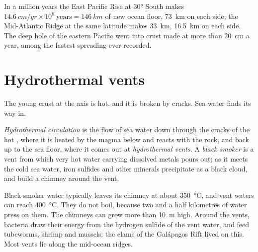 \begin{example}\label{ex:g11:ocean-ridges:rates}
In a million years the East Pacific Rise at \ang{30} South makes
$\qty{14.6}{cm/yr} \times 10^6\ \text{years} = \qty{146}{km}$ of new ocean
floor, \qty{73}{km} on each side; the Mid-Atlantic Ridge at the same latitude
makes \qty{33}{km}, \qty{16.5}{km} on each side. The deep hole of the eastern
Pacific went into crust made at more than \qty{20}{cm} a year, among the
fastest spreading ever recorded.
\end{example}

\section{Hydrothermal vents}

The young crust at the axis is hot, and it is broken by cracks. Sea water
finds its way in.

\begin{definition}\label{def:g11:ocean-ridges:hydrothermal}
\emph{Hydrothermal circulation} is the flow
of sea water down through the cracks of the hot , where it is
heated by the magma below and reacts with the rock, and back up to the sea
floor, where it comes out at \emph{hydrothermal vents}. A \emph{black
smoker} is a vent from which very hot water carrying
dissolved metals pours out; as it meets the cold sea water, iron sulfides and
other minerals precipitate as a black cloud, and build a chimney around the
vent.
\end{definition}

Black-smoker water typically leaves its chimney at about
\qty{350}{\celsius}, and vent waters can reach \qty{400}{\celsius}. They do not
boil, because two and a half kilometres of water press on them. The
chimneys can grow more than \qty{10}{m} high. Around the vents, bacteria draw
their energy from the hydrogen sulfide of the vent water, and feed tubeworms,
shrimp and mussels: the clams of the Galápagos Rift lived on this. Most
vents lie along the mid-ocean ridges.

